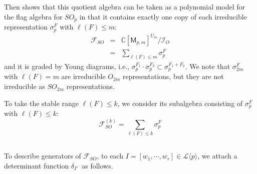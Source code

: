 \documentclass[11pt]{amsart}
\numberwithin{equation}{subsection}
\begin{document}
Then \cite{Ki09} shows that this quotient algebra can be taken as 
a polynomial model for the flag algebra for ${SO}_{p}$ in that it contains exactly 
one copy of each irreducible representation $\sigma _{p}^{F}$ with $\ell (F)\leq m$:
\begin{eqnarray*}
\mathcal{F}_{{SO}} &=& \mathbb{C}[\mathsf{M}_{p,m}]^{U_{m}}/\mathcal{I}_{{O}} \\
                   &=& \sum_{\ell (F)\leq m}\sigma _{p}^{F}
\end{eqnarray*}
and it is graded by Young diagrams, i.e., $\sigma _{p}^{F_1}\cdot \sigma
_{p}^{F_2}\subset \sigma _{p}^{F_1 + F_2}$. We note that $\sigma_{2m}^F$ with $\ell(F)=m$
are irreducible $O_{2m}$ representations, but they are not irreducible as $SO_{2m}$
representations. 

\smallskip

To take the stable range $\ell (F)\leq k$, we consider its subalgebra consisting of 
$\sigma_{p}^{F}$ with $\ell (F)\leq k$:
\begin{equation}
\mathcal{F}_{{SO}}^{(k)}=\sum_{\ell (F)\leq k}\sigma _{p}^{F}  \label{SO-flag}
\end{equation}

\subsection{}

To describe generators of $\mathcal{F}_{SO}$, to each 
$I=[w_{1},\cdots ,w_{r}]\in \mathcal{L}\langle p \rangle$, we attach a
determinant function ${\delta}_{I'}$\ as follows. 
\end{document}
